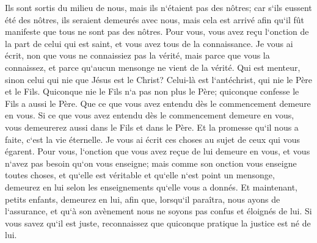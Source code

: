 \verse Ils sont sortis du milieu de nous, mais ils n`étaient pas des nôtres; car s`ils eussent été des nôtres, ils seraient demeurés avec nous, mais cela est arrivé afin qu`il fût manifeste que tous ne sont pas des nôtres. 
\verse Pour vous, vous avez reçu l`onction de la part de celui qui est saint, et vous avez tous de la connaissance. 
\verse Je vous ai écrit, non que vous ne connaissiez pas la vérité, mais parce que vous la connaissez, et parce qu`aucun mensonge ne vient de la vérité. 
\verse Qui est menteur, sinon celui qui nie que Jésus est le Christ? Celui-là est l`antéchrist, qui nie le Père et le Fils. 
\verse Quiconque nie le Fils n`a pas non plus le Père; quiconque confesse le Fils a aussi le Père. 
\verse Que ce que vous avez entendu dès le commencement demeure en vous. Si ce que vous avez entendu dès le commencement demeure en vous, vous demeurerez aussi dans le Fils et dans le Père. 
\verse Et la promesse qu`il nous a faite, c`est la vie éternelle. 
\verse Je vous ai écrit ces choses au sujet de ceux qui vous égarent. 
\verse Pour vous, l`onction que vous avez reçue de lui demeure en vous, et vous n`avez pas besoin qu`on vous enseigne; mais comme son onction vous enseigne toutes choses, et qu`elle est véritable et qu`elle n`est point un mensonge, demeurez en lui selon les enseignements qu`elle vous a donnés. 
\verse Et maintenant, petits enfants, demeurez en lui, afin que, lorsqu`il paraîtra, nous ayons de l`assurance, et qu`à son avènement nous ne soyons pas confus et éloignés de lui. 
\verse Si vous savez qu`il est juste, reconnaissez que quiconque pratique la justice est né de lui. 

\chapter{}

